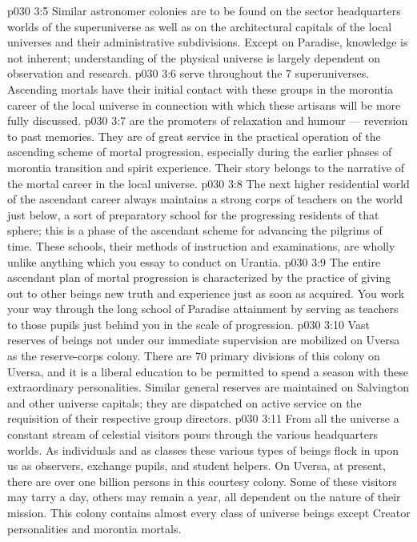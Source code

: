 \vs p030 3:5 Similar astronomer colonies are to be found on the sector headquarters worlds of the superuniverse as well as on the architectural capitals of the local universes and their administrative subdivisions. Except on Paradise, knowledge is not inherent; understanding of the physical universe is largely dependent on observation and research.
\vs p030 3:6 \bibnobreakspace {} serve throughout the 7 superuniverses. Ascending mortals have their initial contact with these groups in the morontia career of the local universe in connection with which these artisans will be more fully discussed.
\vs p030 3:7 \bibnobreakspace {} are the promoters of relaxation and humour --- reversion to past memories. They are of great service in the practical operation of the ascending scheme of mortal progression, especially during the earlier phases of morontia transition and spirit experience. Their story belongs to the narrative of the mortal career in the local universe.
\vs p030 3:8 \bibnobreakspace {} The next higher residential world of the ascendant career always maintains a strong corps of teachers on the world just below, a sort of preparatory school for the progressing residents of that sphere; this is a phase of the ascendant scheme for advancing the pilgrims of time. These schools, their methods of instruction and examinations, are wholly unlike anything which you essay to conduct on Urantia.
\vs p030 3:9 The entire ascendant plan of mortal progression is characterized by the practice of giving out to other beings new truth and experience just as soon as acquired. You work your way through the long school of Paradise attainment by serving as teachers to those pupils just behind you in the scale of progression.
\vs p030 3:10 \bibnobreakspace {} Vast reserves of beings not under our immediate supervision are mobilized on Uversa as the reserve\hyp{}corps colony. There are 70 primary divisions of this colony on Uversa, and it is a liberal education to be permitted to spend a season with these extraordinary personalities. Similar general reserves are maintained on Salvington and other universe capitals; they are dispatched on active service on the requisition of their respective group directors.
\vs p030 3:11 \bibnobreakspace {} From all the universe a constant stream of celestial visitors pours through the various headquarters worlds. As individuals and as classes these various types of beings flock in upon us as observers, exchange pupils, and student helpers. On Uversa, at present, there are over one billion persons in this courtesy colony. Some of these visitors may tarry a day, others may remain a year, all dependent on the nature of their mission. This colony contains almost every class of universe beings except Creator personalities and morontia mortals.
